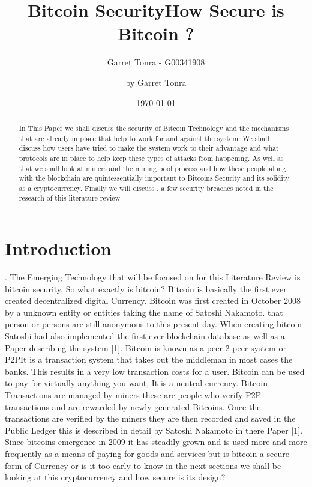 \documentclass[report]{IEEEtran}
\title{Bitcoin Security}
\author{Garret Tonra - G00341908 }
\begin{document}
\title{How Secure is Bitcoin ? }
\author{by Garret Tonra}
\date{\today}


\maketitle

\begin{abstract}\newline
In This Paper we shall discuss the security of Bitcoin Technology and the mechanisms that are already in place that help to work for and against the system. We shall discuss how users have tried to make the system work to their advantage and what protocols are in place to help keep these types of attacks from happening. As well as that we shall look at miners and the mining pool process and how these people along with the blockchain are quintessentially important to Bitcoins Security and its solidity as a cryptocurrency. Finally we will discuss , a few security breaches noted in the research of this literature review       
\end{abstract}


\section{Introduction}.\newline
The Emerging Technology that will be  focused on for this Literature Review is bitcoin security. So what exactly is bitcoin?\newline
Bitcoin is basically the first ever created decentralized digital Currency. Bitcoin was first created in October 2008 by a unknown entity or entities taking the name of Satoshi Nakamoto. that person or persons are still anonymous to this present day. When creating bitcoin Satoshi had also implemented the first ever blockchain database as well as a Paper describing the system [1]. Bitcoin is known as a peer-2-peer system or P2P\newline It is a transaction system that takes out the middleman in most cases the banks. This results in a very low transaction costs for a user. Bitcoin can be used to pay for virtually anything you want, It is a neutral currency. Bitcoin Transactions are managed by miners these are people who verify P2P transactions and are rewarded by newly generated Bitcoins. Once the transactions are verified by the miners they are then recorded and saved in the Public Ledger this is described in detail by Satoshi Nakamoto in there Paper [1]. Since bitcoins emergence in 2009 it has steadily grown and is used more and more frequently as a means of paying for goods and services but is bitcoin a secure form of Currency or is it too early to know in the next sections we shall be looking at this cryptocurrency and how secure is its design?
\end{document}
